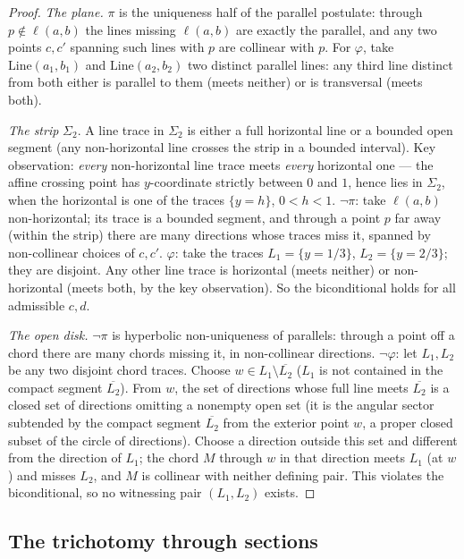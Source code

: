 \documentclass[11pt]{amsart}
\theoremstyle{definition}
\begin{document}
\begin{proof}
\emph{The plane.} $\pi$ is the uniqueness half of the parallel postulate:
through $p\notin\ell(a,b)$ the lines missing $\ell(a,b)$ are exactly the
parallel, and any two points $c,c'$ spanning such lines with $p$ are
collinear with $p$. For $\varphi$, take $\mathrm{Line}(a_1,b_1)$ and
$\mathrm{Line}(a_2,b_2)$ two distinct parallel lines: any third line
distinct from both either is parallel to them (meets neither) or is
transversal (meets both).

\emph{The strip} $\Sigma_2$. A line trace in $\Sigma_2$ is either a full
horizontal line or a bounded open segment (any non-horizontal line crosses
the strip in a bounded interval). Key observation: \emph{every}
non-horizontal line trace meets \emph{every} horizontal one --- the affine
crossing point has $y$-coordinate strictly between $0$ and $1$, hence lies
in $\Sigma_2$, when the horizontal is one of the traces $\{y=h\}$, $0<h<1$.
$\neg\pi$: take $\ell(a,b)$ non-horizontal; its trace is a bounded segment,
and through a point $p$ far away (within the strip) there are many
directions whose traces miss it, spanned by non-collinear choices of
$c,c'$. $\varphi$: take the traces $L_1=\{y=1/3\}$, $L_2=\{y=2/3\}$; they
are disjoint. Any other line trace is horizontal (meets neither) or
non-horizontal (meets both, by the key observation). So the biconditional
holds for all admissible $c,d$.

\emph{The open disk.} $\neg\pi$ is hyperbolic non-uniqueness of parallels:
through a point off a chord there are many chords missing it, in
non-collinear directions. $\neg\varphi$: let $L_1,L_2$ be any two disjoint
chord traces. Choose $w\in L_1\setminus\overline{L_2}$ ($L_1$ is not
contained in the compact segment $\overline{L_2}$). From $w$, the set of
directions whose full line meets $\overline{L_2}$ is a closed set of
directions omitting a nonempty open set (it is the angular sector subtended
by the compact segment $\overline{L_2}$ from the exterior point $w$, a
proper closed subset of the circle of directions). Choose a direction
outside this set and different from the direction of $L_1$; the chord $M$
through $w$ in that direction meets $L_1$ (at $w$) and misses $L_2$, and $M$
is collinear with neither defining pair. This violates the biconditional,
so no witnessing pair $(L_1,L_2)$ exists.
\end{proof}

\subsection{The trichotomy through sections}
\end{document}
